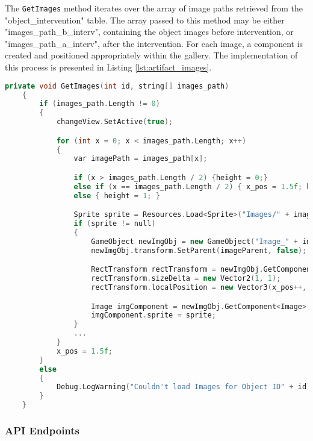 The \texttt{GetImages} method iterates over the array of image paths retrieved from the "object\_intervention" table. The array passed to this method may be either "images\_path\_b\_interv", containing the object images before intervention, or "images\_path\_a\_interv", after the intervention.
For each image, a component is created and positioned appropriately within the gallery.
The implementation of this process is presented in Listing \ref{lst:artifact_images}.

\newpage
\begin{lstlisting}[language=C++, caption={Method used to load artifact images and to display them in the Images Gallery.}, label={lst:artifact_images}]
      private void GetImages(int id, string[] images_path)
    {
        if (images_path.Length != 0)
        {
            changeView.SetActive(true);

            for (int x = 0; x < images_path.Length; x++)
            {
                var imagePath = images_path[x];

                if (x > images_path.Length / 2) {height = 0;}
                else if (x == images_path.Length / 2) { x_pos = 1.5f; height = 0; }
                else { height = 1; }

                Sprite sprite = Resources.Load<Sprite>("Images/" + imagePath);
                if (sprite != null)
                {
                    GameObject newImgObj = new GameObject("Image_" + imagePath, typeof(RectTransform), typeof(CanvasRenderer), typeof(Image));
                    newImgObj.transform.SetParent(imageParent, false);

                    RectTransform rectTransform = newImgObj.GetComponent<RectTransform>();
                    rectTransform.sizeDelta = new Vector2(1, 1);
                    rectTransform.localPosition = new Vector3(x_pos++, height, 0);

                    Image imgComponent = newImgObj.GetComponent<Image>();
                    imgComponent.sprite = sprite;
                }
                ...
            }
            x_pos = 1.5f;
        }
        else
        {
            Debug.LogWarning("Couldn't load Images for Object ID" + id);
        }
    }
\end{lstlisting}


\subsubsection{\gls{API} Endpoints}

